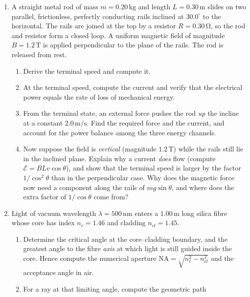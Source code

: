\documentclass[11pt,a4paper]{article}
\newcommand{\unit}[1]{\,\mathrm{#1}}
\newenvironment{parts}{\begin{enumerate}[label=\textbf{\alph*)}]}{\end{enumerate}}
\begin{document}
\begin{parts}
\item A straight metal rod of mass $m=0.20\unit{kg}$ and length
      $L=0.30\unit{m}$ slides on two parallel, frictionless, perfectly
      conducting rails inclined at $30.0^\circ$ to the horizontal. The rails
      are joined at the top by a resistor $R=0.30\unit{\Omega}$, so the rod
      and resistor form a closed loop. A uniform magnetic field of magnitude
      $B=1.2\unit{T}$ is applied perpendicular to the plane of the rails. The
      rod is released from rest.
      \begin{enumerate}[label=\roman*.]
      \item Derive the terminal speed and compute it.
      \item At the terminal speed, compute the current and verify that the
            electrical power equals the rate of loss of mechanical energy.
      \item From the terminal state, an external force pushes the rod
            \emph{up} the incline at a constant $2.0\unit{m/s}$. Find the
            required force and the current, and account for the power balance
            among the three energy channels.
      \item Now suppose the field is \emph{vertical} (magnitude $1.2\unit{T}$)
            while the rails still lie in the inclined plane. Explain why a
            current \emph{does} flow (compute $\mathcal{E}=BLv\cos\theta$),
            and show that the terminal speed is larger by the factor
            $1/\cos^2\theta$ than in the perpendicular case. Why does the
            magnetic force now need a component along the rails of
            $mg\sin\theta$, and where does the extra factor of $1/\cos\theta$
            come from?
      \end{enumerate}
\item Light of vacuum wavelength $\lambda=500\unit{nm}$ enters a
      $1.00\unit{m}$ long silica fibre whose core has index $n_c=1.46$ and
      cladding $n_{cl}=1.45$.
      \begin{enumerate}[label=\roman*.]
      \item Determine the critical angle at the core--cladding boundary, and
            the greatest angle to the fibre \emph{axis} at which light is
            still guided inside the core. Hence compute the numerical
            aperture $\mathrm{NA}=\sqrt{n_c^2-n_{cl}^2}$ and the acceptance
            angle in air.
      \item For a ray at that limiting angle, compute the geometric path

\end{enumerate}
\end{parts}
\end{document}
